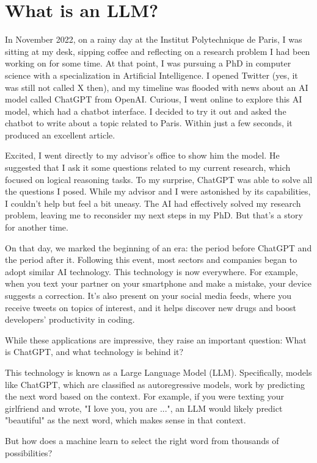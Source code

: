 \chapter{What is an LLM?}
In November 2022, on a rainy day at the Institut Polytechnique de Paris, I was sitting at my desk, sipping coffee and reflecting on a research problem I had been working on for some time. At that point, I was pursuing a PhD in computer science with a specialization in Artificial Intelligence. I opened Twitter (yes, it was still not called X then), and my timeline was flooded with news about an AI model called ChatGPT from OpenAI. Curious, I went online to explore this AI model, which had a chatbot interface. I decided to try it out and asked the chatbot to write about a topic related to Paris. Within just a few seconds, it produced an excellent article. 

Excited, I went directly to my advisor's office to show him the model. He suggested that I ask it some questions related to my current research, which focused on logical reasoning tasks. To my surprise, ChatGPT was able to solve all the questions I posed. While my advisor and I were astonished by its capabilities, I couldn't help but feel a bit uneasy. The AI had effectively solved my research problem, leaving me to reconsider my next steps in my PhD. But that's a story for another time.

On that day, we marked the beginning of an era: the period before ChatGPT and the period after it. Following this event, most sectors and companies began to adopt similar AI technology. This technology is now everywhere. For example, when you text your partner on your smartphone and make a mistake, your device suggests a correction. It's also present on your social media feeds, where you receive tweets on topics of interest, and it helps discover new drugs and boost developers' productivity in coding.

While these applications are impressive, they raise an important question: What is ChatGPT, and what technology is behind it?

This technology is known as a Large Language Model (LLM). Specifically, models like ChatGPT, which are classified as autoregressive models, work by predicting the next word based on the context. For example, if you were texting your girlfriend and wrote, "I love you, you are ...", an LLM would likely predict "beautiful" as the next word, which makes sense in that context.

But how does a machine learn to select the right word from thousands of possibilities? 


